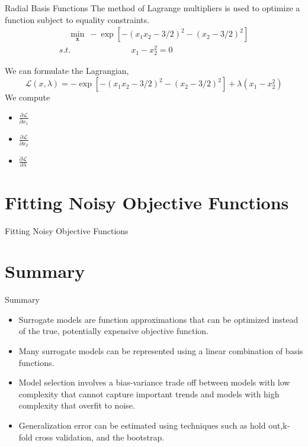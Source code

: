 \documentclass{beamer}
\begin{document}
\begin{frame}{Radial Basis Functions}
The method of Lagrange multipliers is used to optimize a function subject to equality
constraints. 
\begin{gather*}
    ~~~~~ \underset{\boldsymbol{x}}{\min} ~ -\exp[-(x_1x_2-3/2)^2 - (x_2-3/2)^2] \\
    {s.t.}~~~~~~~~~~~~~~~~~~~~~~~~~~~~~~~~~ x_1 - x_2^2 = 0 
\end{gather*}

We can formulate the Lagrangian, 
\begin{equation*}
    \mathcal{L}(x, \lambda) = -\exp[-(x_1x_2-3/2)^2 - (x_2-3/2)^2] + \lambda(x_1 - x_2^2)
\end{equation*}
We compute
\begin{itemize}
    \item $\frac{\partial \mathcal{L}}{\partial x_1}$
    \item $\frac{\partial \mathcal{L}}{\partial x_2}$
    \item $\frac{\partial \mathcal{L}}{\partial \lambda}$
\end{itemize}

\end{frame}

\section{Fitting Noisy Objective Functions}
\begin{frame}{Fitting Noisy Objective Functions}
    
\end{frame}

\section{Summary}
\begin{frame}{Summary}
    \begin{itemize}
        \item Surrogate models are function approximations that can be optimized instead of the true, potentially expensive objective function.
        \item Many surrogate models can be represented using a linear combination of basis functions.
        \item Model selection involves a bias-variance trade off between models with low complexity that cannot capture important trends and models with high complexity that overfit to noise.
        \item Generalization error can be estimated using techniques such as hold out,k-fold cross validation, and the bootstrap.
    \end{itemize}
\end{frame}
\end{document}
